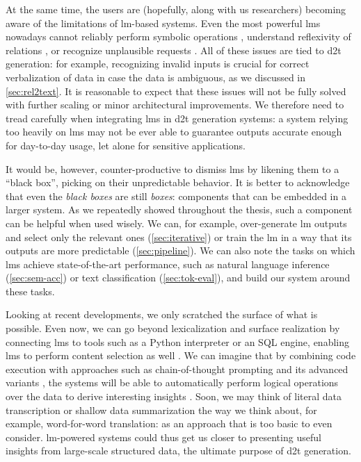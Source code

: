 At the same time, the users are (hopefully, along with us researchers) becoming aware of the limitations of \ac{lm}-based systems. Even the most powerful \acp{lm} nowadays cannot reliably perform symbolic operations \cite{qian2023limitations}, understand reflexivity of relations \cite{berglund2024the}, or recognize unplausible requests \cite{yin2023large}. All of these issues are tied to \ac{d2t} generation: for example, recognizing invalid inputs is crucial for correct verbalization of data in case the data is ambiguous, as we discussed in \autoref{sec:rel2text}. It is reasonable to expect that these issues will not be fully solved with further scaling or minor architectural improvements. We therefore need to tread carefully when integrating \acp{lm} in \ac{d2t} generation systems: a system relying too heavily on \acp{lm} may not be ever able to guarantee outputs accurate enough for day-to-day usage, let alone for sensitive applications.

It would be, however, counter-productive to dismiss \acp{lm} by likening them to a ``black box'', picking on their unpredictable behavior. It is better to acknowledge that even the \emph{black boxes} are still \emph{boxes}: components that can be embedded in a larger system. As we repeatedly showed throughout the thesis, such a component can be helpful when used wisely. We can, for example, over-generate \ac{lm} outputs and select only the relevant ones (\autoref{sec:iterative}) or train the \ac{lm} in a way that its outputs are more predictable (\autoref{sec:pipeline}). We can also note the tasks on which \acp{lm} achieve state-of-the-art performance, such as natural language inference (\autoref{sec:sem-acc}) or text classification (\autoref{sec:tok-eval}), and build our system around these tasks.

Looking at recent developments, we only scratched the surface of what is possible. Even now, we can go beyond lexicalization and surface realization by connecting \acp{lm} to tools such as a Python interpreter or an SQL engine, enabling \acp{lm} to perform content selection as well \cite{cao-etal-2023-api,jiang-etal-2023-structgpt,gemmell2023generate}. We can imagine that by combining code execution with approaches such as chain-of-thought prompting and its advanced variants \cite{weiChainThoughtPrompting2022,chu2023survey}, the systems will be able to automatically perform logical operations over the data to derive interesting insights \cite{zhao-etal-2023-qtsumm,chenLogicalNaturalLanguage2020,chenLogic2TextHighFidelityNatural2020}. Soon, we may think of literal data transcription or shallow data summarization the way we think about, for example, word-for-word translation: as an approach that is too basic to even consider. \ac{lm}-powered systems could thus get us closer to presenting useful insights from large-scale structured data, the ultimate purpose of \ac{d2t} generation.

